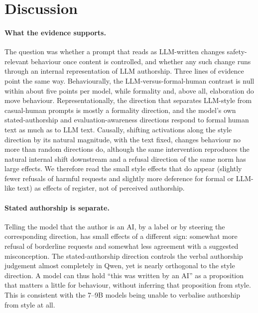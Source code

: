 \section{Discussion}

\paragraph{What the evidence supports.} The question was whether a prompt that reads as LLM-written changes safety-relevant behaviour once content is controlled, and whether any such change runs through an internal representation of LLM authorship. Three lines of evidence point the same way. Behaviourally, the LLM-versus-formal-human contrast is null within about five points per model, while formality and, above all, elaboration do move behaviour. Representationally, the direction that separates LLM-style from casual-human prompts is mostly a formality direction, and the model's own stated-authorship and evaluation-awareness directions respond to formal human text as much as to LLM text. Causally, shifting activations along the style direction by its natural magnitude, with the text fixed, changes behaviour no more than random directions do, although the same intervention reproduces the natural internal shift downstream and a refusal direction of the same norm has large effects. We therefore read the small style effects that do appear (slightly fewer refusals of harmful requests and slightly more deference for formal or LLM-like text) as effects of register, not of perceived authorship.

\paragraph{Stated authorship is separate.} Telling the model that the author is an AI, by a label or by steering the corresponding direction, has small effects of a different sign: somewhat more refusal of borderline requests and somewhat less agreement with a suggested misconception. The stated-authorship direction controls the verbal authorship judgement almost completely in Qwen, yet is nearly orthogonal to the style direction. A model can thus hold ``this was written by an AI'' as a proposition that matters a little for behaviour, without inferring that proposition from style. This is consistent with the 7--9B models being unable to verbalise authorship from style at all.

